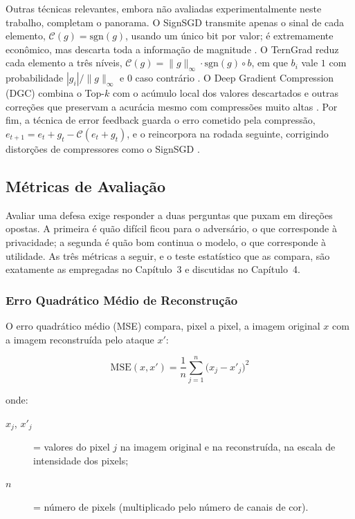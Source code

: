 Outras técnicas relevantes, embora não avaliadas experimentalmente neste trabalho, completam o panorama. O SignSGD transmite apenas o sinal de cada elemento, $\mathcal{C}(g) = \mathrm{sgn}(g)$, usando um único bit por valor; é extremamente econômico, mas descarta toda a informação de magnitude \cite{Bernstein2018}. O TernGrad reduz cada elemento a três níveis, $\mathcal{C}(g) = \|g\|_\infty \cdot \mathrm{sgn}(g) \circ b$, em que $b_i$ vale $1$ com probabilidade $|g_i|/\|g\|_\infty$ e $0$ caso contrário \cite{Wen2017}. O Deep Gradient Compression (DGC) combina o Top-$k$ com o acúmulo local dos valores descartados e outras correções que preservam a acurácia mesmo com compressões muito altas \cite{Lin2018}. Por fim, a técnica de error feedback guarda o erro cometido pela compressão, $e_{t+1} = e_t + g_t - \mathcal{C}(e_t + g_t)$, e o reincorpora na rodada seguinte, corrigindo distorções de compressores como o SignSGD \cite{Karimireddy2019}.

\subsection{Métricas de Avaliação} \label{sec:metricas}

Avaliar uma defesa exige responder a duas perguntas que puxam em direções opostas. A primeira é quão difícil ficou para o adversário, o que corresponde à privacidade; a segunda é quão bom continua o modelo, o que corresponde à utilidade. As três métricas a seguir, e o teste estatístico que as compara, são exatamente as empregadas no Capítulo~3 e discutidas no Capítulo~4.

\subsubsection{Erro Quadrático Médio de Reconstrução}

O erro quadrático médio (MSE) compara, pixel a pixel, a imagem original $x$ com a imagem reconstruída pelo ataque $x'$:

\begin{equation} \label{eq:mse}
\mathrm{MSE}(x, x') = \frac{1}{n} \sum_{j=1}^{n} \big( x_j - x'_j \big)^{2}
\end{equation}

\noindent onde:
\begin{description}
  \item[$x_j$, $x'_j$] = valores do pixel $j$ na imagem original e na reconstruída, na escala de intensidade dos pixels;
  \item[$n$] = número de pixels (multiplicado pelo número de canais de cor).
\end{description}


